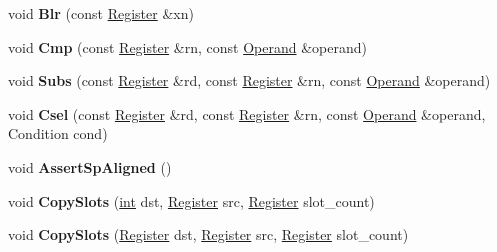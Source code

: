 \begin{DoxyCompactItemize}
\item 
\mbox{\label{classv8_1_1internal_1_1TurboAssembler_a2b22a4b04cb0de457e7f89d7e9b75dcf}} 
void {\bfseries Blr} (const \mbox{\hyperlink{classv8_1_1internal_1_1Register}{Register}} \&xn)
\item 
\mbox{\label{classv8_1_1internal_1_1TurboAssembler_a6dfc597d7eae4632fc2ff86a2053ea99}} 
void {\bfseries Cmp} (const \mbox{\hyperlink{classv8_1_1internal_1_1Register}{Register}} \&rn, const \mbox{\hyperlink{classv8_1_1internal_1_1Operand}{Operand}} \&operand)
\item 
\mbox{\label{classv8_1_1internal_1_1TurboAssembler_a8f9001768dca856e77876e10402d30e4}} 
void {\bfseries Subs} (const \mbox{\hyperlink{classv8_1_1internal_1_1Register}{Register}} \&rd, const \mbox{\hyperlink{classv8_1_1internal_1_1Register}{Register}} \&rn, const \mbox{\hyperlink{classv8_1_1internal_1_1Operand}{Operand}} \&operand)
\item 
\mbox{\label{classv8_1_1internal_1_1TurboAssembler_a129622c49165008edfb95bc2f5e65b7e}} 
void {\bfseries Csel} (const \mbox{\hyperlink{classv8_1_1internal_1_1Register}{Register}} \&rd, const \mbox{\hyperlink{classv8_1_1internal_1_1Register}{Register}} \&rn, const \mbox{\hyperlink{classv8_1_1internal_1_1Operand}{Operand}} \&operand, Condition cond)
\item 
\mbox{\label{classv8_1_1internal_1_1TurboAssembler_a1074478173fa30e64b57c0840891ccee}} 
void {\bfseries Assert\+Sp\+Aligned} ()
\item 
\mbox{\label{classv8_1_1internal_1_1TurboAssembler_aa6c49a449811ed0a6de2ba917e859a5e}} 
void {\bfseries Copy\+Slots} (\mbox{\hyperlink{classint}{int}} dst, \mbox{\hyperlink{classv8_1_1internal_1_1Register}{Register}} src, \mbox{\hyperlink{classv8_1_1internal_1_1Register}{Register}} slot\+\_\+count)
\item 
\mbox{\label{classv8_1_1internal_1_1TurboAssembler_a9cb14e3b88cdbcb99df00dc0bd1ca894}} 
void {\bfseries Copy\+Slots} (\mbox{\hyperlink{classv8_1_1internal_1_1Register}{Register}} dst, \mbox{\hyperlink{classv8_1_1internal_1_1Register}{Register}} src, \mbox{\hyperlink{classv8_1_1internal_1_1Register}{Register}} slot\+\_\+count)

\end{DoxyCompactItemize}
